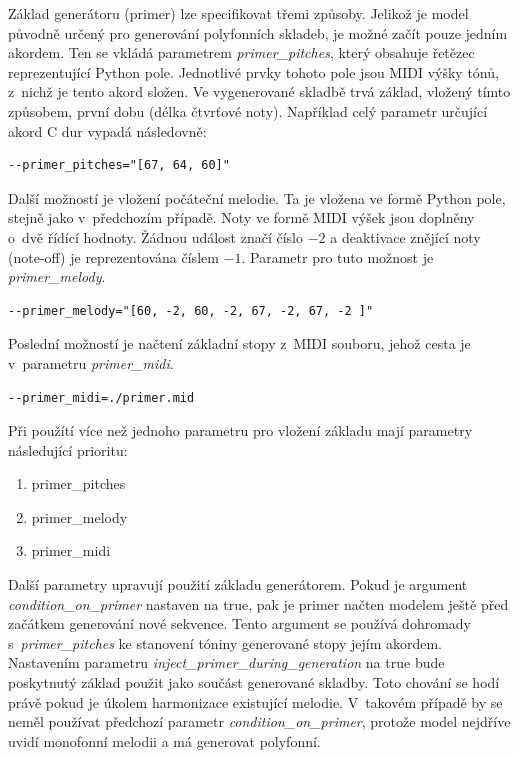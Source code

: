 Základ generátoru (primer) lze specifikovat třemi způsoby.
Jelikož je model původně určený pro generování polyfonních skladeb,
je možné začít pouze jedním akordem.
Ten se vkládá parametrem \emph{primer\_pitches},
který obsahuje řetězec reprezentující Python pole.
Jednotlivé prvky tohoto pole jsou MIDI výšky tónů,
z~nichž je tento akord složen.
Ve vygenerované skladbě trvá základ, 
vložený tímto způsobem, první dobu (délka čtvrťové noty).
Například celý parametr určující akord C dur vypadá následovně:

\begin{verbatim}
--primer_pitches="[67, 64, 60]"
\end{verbatim}
Další možností je vložení počáteční melodie.
Ta je vložena ve formě Python pole, stejně jako v~předchozím případě.
Noty ve formě MIDI výšek jsou doplněny o~dvě řídící hodnoty.
Žádnou událost značí číslo $-2$ a 
deaktivace znějící noty (note-off) je reprezentována číslem $-1$.
Parametr pro tuto možnost je \emph{primer\_melody}.

\begin{verbatim}
--primer_melody="[60, -2, 60, -2, 67, -2, 67, -2 ]"  
\end{verbatim}
Poslední možností je načtení základní stopy z~MIDI souboru,
jehož cesta je v~parametru \emph{primer\_midi}.
\begin{verbatim}
--primer_midi=./primer.mid 
\end{verbatim}
Při použítí více než jednoho parametru pro vložení základu
mají parametry následující prioritu:
\begin{enumerate}
    \item primer\_pitches
    \item primer\_melody
    \item primer\_midi
\end{enumerate}
Další parametry upravují použití základu generátorem.
Pokud je argument \emph{condition\_on\_primer} nastaven na true, 
pak je primer načten modelem ještě před začátkem generování nové sekvence.
Tento argument se používá dohromady s~\emph{primer\_pitches} 
ke stanovení tóniny generované stopy jejím akordem.
Nastavením parametru \emph{inject\_primer\_during\_generation} na true
bude poskytnutý základ použit jako součást generované skladby.
Toto chování se hodí právě pokud je úkolem harmonizace existující melodie.
V~takovém případě by se neměl používat předchozí parametr \emph{condition\_on\_primer},
protože model nejdříve uvidí monofonní melodii 
a má generovat polyfonní.
\cite{google_git_polyphony}

